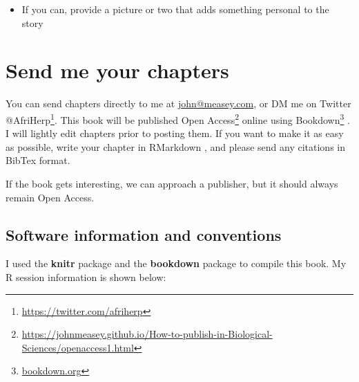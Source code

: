 \documentclass[
]{krantz}
\renewcommand{\href}[2]{#2\footnote{\url{#1}}}
\begin{document}
\begin{itemize}
  \begin{itemize}
  \item
    What were the major changes that you made to the manuscript
    between the first submission and acceptance
  \item
    Who made the difference between the rejections and acceptance of
    your paper and what did they do?
  \item
    What were the major lessons that you learned, and how has this
    changed your approach to publishing moving forwards?
  \item
    What advice can you give to Early Career Researchers who might
    be in the middle of their biggest publishing story, but not at
    the point where they have had their manuscript accepted?
  \end{itemize}
\item
  If you can, provide a picture or two that adds something personal to
  the story
\end{itemize}

\hypertarget{send-me-your-chapters}{%
\chapter*{Send me your chapters}\label{send-me-your-chapters}}


You can send chapters directly to me at
\url{john@measey.com}, or DM me on Twitter
\href{https://twitter.com/afriherp}{@AfriHerp}. This book will be published
\href{https://johnmeasey.github.io/How-to-publish-in-Biological-Sciences/openaccess1.html}{Open
Access}
online using \href{bookdown.org}{Bookdown} \citep{bookdown2016}. I will lightly
edit chapters prior to posting them. If you want to make it as easy as
possible, write your chapter in RMarkdown \citep{rmarkdown2018}, and please
send any citations in BibTex format.

If the book gets interesting, we can approach a publisher, but it should
always remain Open Access.

\hypertarget{software-information-and-conventions}{%
\section*{Software information and conventions}\label{software-information-and-conventions}}


I used the \textbf{knitr} package \citep{xie2015} and the
\textbf{bookdown} package \citep{R-bookdown} to compile this book.
My R session information is shown below:
\end{document}
